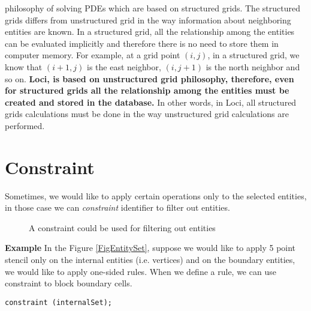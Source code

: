 philosophy of solving PDEs which are based on structured grids. The structured
grids differs from unstructured grid in the way information about neighboring
entities are known. In a structured grid, all the relationship among the
entities can be evaluated implicitly and therefore there is no need to store
them in computer memory. For example, at a grid point $(i,j)$, in a structured
grid, we know that $(i+1,j)$ is the east neighbor, $(i,j+1)$ is the north
neighbor and so on. {\bf Loci, is based on unstructured grid philosophy,
therefore, even for structured grids all the relationship among the entities
must be created and stored in the database.} In other words, in Loci, all 
structured grids calculations must be done in the way unstructured grid
calculations are performed.
%


%


\section {Constraint}
Sometimes, we would like to apply certain operations only to the selected entities, 
in those case we can {\em constraint} identifier to filter out entities.

\begin{figure}[h]
\vspace*{8cm}\caption {A constraint could be used for filtering out entities }
\label{FigConstraint}
\end{figure}

\par {\bf Example} In the Figure \ref{FigEntitySet}, suppose we would like to 
apply 5 point stencil only on the internal entities (i.e. vertices) and on the 
boundary entities, we would like to apply one-sided rules. When we define a 
rule, we can use constraint to block boundary cells. \\
\begin{verbatim}
constraint (internalSet);
\end{verbatim}


